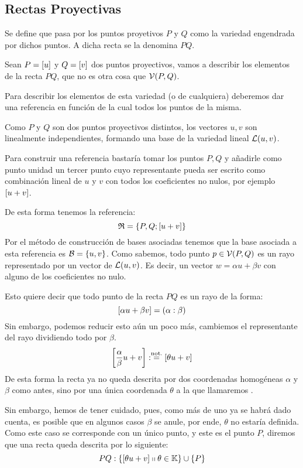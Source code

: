 \subsection{Rectas Proyectivas}
\begin{defi}
	\label{C1_def_rectaProyectiva}
	Se define  que pasa por los puntos proyetivos $P$ y $Q$ como la variedad engendrada por dichos puntos. A dicha recta se la denomina  $PQ$.
\end{defi}
\begin{exa}
	\label{C1_exa_descripcionRecta}
	Sean $P=\left [ u \right ]$ y $Q=\left [ v \right ]$ dos puntos proyectivos, vamos a describir los elementos de la recta $PQ$, que no es otra cosa que $\mathcal{V}(P,Q)$.
	
	Para describir los elementos de esta variedad (o de cualquiera) deberemos dar una referencia en función de la cual  todos los puntos de la misma.
	
	Como $P$ y $Q$ son dos puntos proyectivos distintos, los vectores $u,v$ son linealmente independientes, formando una base de la variedad lineal $\mathcal{L}(u,v)$.
	
	Para construir una referencia bastaría tomar los puntos $P,Q$ y añadirle como punto unidad un tercer punto cuyo representante pueda ser escrito como combinación lineal de $u$ y $v$ con todos los coeficientes no nulos, por ejemplo $\left [ u+v \right ]$.
	
	De esta forma tenemos la referencia:
	\[\mathfrak{R}=\{P,Q;\left [ u+v \right ]\}\]
	Por el método de construcción de bases asociadas tenemos que la base asociada a esta referencia es $\mathcal{B}=\{u,v\}$. Como sabemos, todo punto $p\in\mathcal{V}(P,Q)$ es un rayo representado por un vector de $\mathcal{L}(u,v)$. Es decir, un vector $w=\alpha u+\beta v$ con alguno de los coeficientes no nulo.
	
	Esto quiere decir que todo punto de la recta $PQ$ es un rayo de la forma: \[\left [ \alpha u+\beta v \right ]=(\alpha:\beta)\]
	Sin embargo, podemos reducir esto aún un poco más, cambiemos el representante del rayo dividiendo todo por $\beta$.
	\[\left [ \frac{\alpha}{\beta}u+v \right ]:\stackrel{\textrm{not.}}{=}\left [ \theta u+v \right ]\]
	De esta forma la recta ya no queda descrita por dos coordenadas homogéneas $\alpha$ y $\beta$ como antes, sino por una única coordenada $\theta$ a la que llamaremos .
	
	Sin embargo, hemos de tener cuidado, pues, como más de uno ya se habrá dado cuenta, es posible que en algunos casos $\beta$ se anule, por ende, $\theta$ no estaría definida. Como este caso se corresponde con un único punto, y este es el punto $P$, diremos que una recta queda descrita por lo siguiente:
	\begin{equation}
	\label{C1_eq_descripcionRecta}
		PQ:\{\left [ \theta u+v \right ]\shortparallel \theta\in\mathbb{K}\}\cup\{P\}
	\end{equation}
\end{exa}
